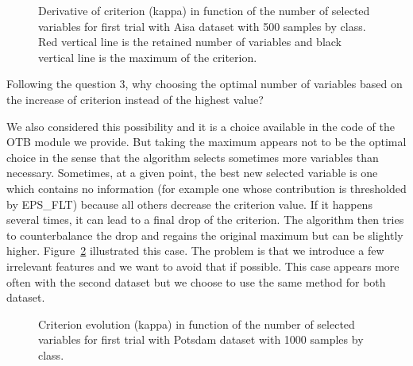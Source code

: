 \documentclass[a4paper,10pt,DIV=16]{scrartcl}
\begin{document}
\begin{figure}[!ht]
  \centering
  \caption{Derivative of criterion (kappa) in function of the number of selected variables for first trial with Aisa dataset with 500 samples by class. Red vertical line is the retained number of variables and black vertical line is the maximum of the criterion.\label{fig:deriv}}
\end{figure}


\begin{revbox}
  Following the question 3, why choosing the optimal number of variables based on the increase of criterion instead of the highest value?
  \begin{resbox}
    We also considered this possibility and it is a choice available in the code of the OTB module we provide. But taking the maximum appears not to be the optimal choice in the sense that the algorithm selects sometimes more variables than necessary. Sometimes, at a given point, the best new selected variable is one which contains no information (for example one whose contribution is thresholded by EPS\_FLT) because all others decrease the criterion value. If it happens several times, it can lead to a final drop of the criterion. The algorithm then tries to counterbalance the drop and regains the original maximum but can be slightly higher. Figure~\ref{fig:crit-evol} illustrated this case.
    The problem is that we introduce a few irrelevant features and we want to avoid that if possible. This case appears more often with the second dataset but we choose to use the same method for both dataset.
  \end{resbox}
\end{revbox}

\begin{figure}[!t]
  \centering
  \caption{Criterion evolution (kappa) in function of the number of selected variables for first trial with Potsdam dataset with 1000 samples by class.\label{fig:crit-evol}}
\end{figure}
\end{document}
